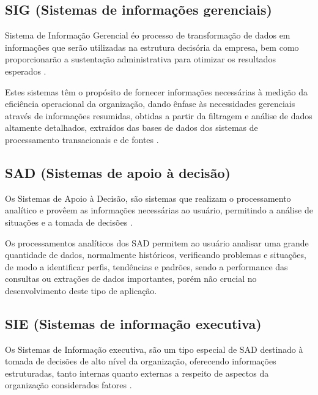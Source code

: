\subsection{SIG (Sistemas de informa\c{c}\~{o}es gerenciais)}

Sistema de Informa\c{c}\~{a}o Gerencial \'{e}o processo de transforma\c{c}\~{a}o de dados em informa\c{c}\~{o}es que ser\~{a}o utilizadas na estrutura decis\'{o}ria da empresa, bem como proporcionar\~{a}o a sustenta\c{c}\~{a}o administrativa para otimizar os resultados esperados \cite{si-oliveira-1998}.

\begin{flushleft}
	Estes sistemas têm o prop\'{o}sito de fornecer informa\c{c}\~{o}es necess\'{a}rias \`{a} medi\c{c}\~{a}o da eficiência operacional da organiza\c{c}\~{a}o, dando ênfase \`{a}s necessidades gerenciais atrav\'{e}s de informa\c{c}\~{o}es resumidas, obtidas a partir da filtragem e an\'{a}lise de dados altamente detalhados, extra\'{i}dos das bases de dados dos sistemas de processamento transacionais e de fontes \cite{si-stair-1998} \cite{si-falsarella-chaves-1998}.
\end{flushleft}

\subsection{SAD (Sistemas de apoio \`{a} decis\~{a}o)}

Os Sistemas de Apoio \`{a} Decis\~{a}o, s\~{a}o sistemas que realizam o processamento anal\'{i}tico e provêem as informa\c{c}\~{o}es necess\'{a}rias ao usu\'{a}rio, permitindo a an\'{a}lise de situa\c{c}\~{o}es e a tomada de decis\~{o}es \cite{si-inmon-1997}.

Os processamentos anal\'{i}ticos dos SAD permitem ao usu\'{a}rio analisar uma grande quantidade de dados, normalmente hist\'{o}ricos, verificando problemas e situa\c{c}\~{o}es, de modo a identificar perfis, tendências e padr\~{o}es, sendo a performance das consultas ou extra\c{c}\~{o}es de dados importantes, por\'{e}m n\~{a}o crucial no desenvolvimento deste tipo de aplica\c{c}\~{a}o.

\subsection{SIE (Sistemas de informa\c{c}\~{a}o executiva)}

Os Sistemas de Informa\c{c}\~{a}o executiva, s\~{a}o um tipo especial de SAD destinado \`{a} tomada de decis\~{o}es de alto n\'{i}vel da organiza\c{c}\~{a}o, oferecendo informa\c{c}\~{o}es estruturadas, tanto internas quanto externas a respeito de aspectos da organiza\c{c}\~{a}o considerados fatores \cite{si-stair-1998} \cite{si-falsarella-chaves-1998}.

